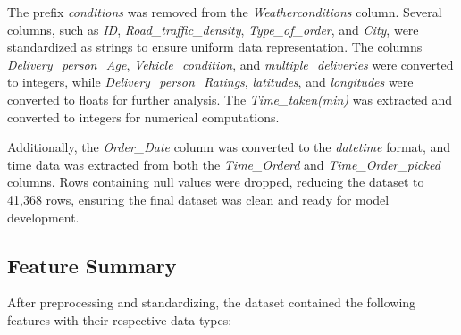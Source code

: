\documentclass[10pt,twocolumn,letterpaper]{article}
\begin{document}
        The prefix \textit{conditions} was removed from the \textit{Weatherconditions} column. Several columns, such as \textit{ID}, \textit{Road\_traffic\_density}, \textit{Type\_of\_order}, and \textit{City}, were standardized as strings to ensure uniform data representation. The columns \textit{Delivery\_person\_Age}, \textit{Vehicle\_condition}, and \textit{multiple\_deliveries} were converted to integers, while \textit{Delivery\_person\_Ratings}, \textit{latitudes}, and \textit{longitudes} were converted to floats for further analysis. The \textit{Time\_taken(min)} was extracted and converted to integers for numerical computations.

        Additionally, the \textit{Order\_Date} column was converted to the \textit{datetime} format, and time data was extracted from both the \textit{Time\_Orderd} and \textit{Time\_Order\_picked} columns. Rows containing null values were dropped, reducing the dataset to 41,368 rows, ensuring the final dataset was clean and ready for model development.

        \subsection{Feature Summary}
        After preprocessing and standardizing, the dataset contained the following features with their respective data types:
\end{document}

